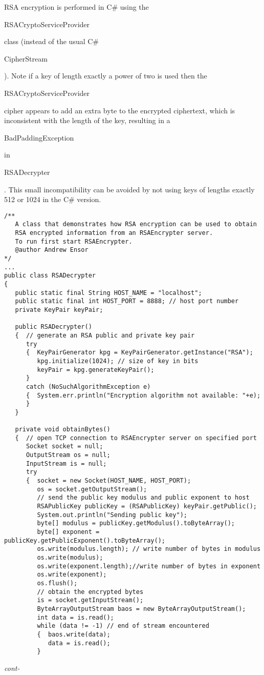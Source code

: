 RSA encryption is performed in C\# using the \begin{code}RSACryptoServiceProvider\end{code}
class (instead of the usual C\# \begin{code}CipherStream\end{code}).
Note if a key of length exactly a power of two is used then the
\begin{code}RSACryptoServiceProvider\end{code} cipher appears to add an
extra byte to the encrypted ciphertext, which is inconsistent
with the length of the key,
resulting in a \begin{code}BadPaddingException\end{code} in \begin{code}RSADecrypter\end{code}.
This small incompatibility can be avoided by not using keys of lengths
exactly 512 or 1024 in the C\# version.
\begin{figure*}\begin{program}\begin{verbatim}
/**
   A class that demonstrates how RSA encryption can be used to obtain
   RSA encrypted information from an RSAEncrypter server.
   To run first start RSAEncrypter.
   @author Andrew Ensor
*/
...
public class RSADecrypter
{
   public static final String HOST_NAME = "localhost";
   public static final int HOST_PORT = 8888; // host port number
   private KeyPair keyPair;

   public RSADecrypter()
   {  // generate an RSA public and private key pair
      try
      {  KeyPairGenerator kpg = KeyPairGenerator.getInstance("RSA");
         kpg.initialize(1024); // size of key in bits
         keyPair = kpg.generateKeyPair();
      }
      catch (NoSuchAlgorithmException e)
      {  System.err.println("Encryption algorithm not available: "+e);
      }
   }

   private void obtainBytes()
   {  // open TCP connection to RSAEncrypter server on specified port
      Socket socket = null;
      OutputStream os = null;
      InputStream is = null;
      try
      {  socket = new Socket(HOST_NAME, HOST_PORT);
         os = socket.getOutputStream();
         // send the public key modulus and public exponent to host
         RSAPublicKey publicKey = (RSAPublicKey) keyPair.getPublic();
         System.out.println("Sending public key");
         byte[] modulus = publicKey.getModulus().toByteArray();
         byte[] exponent = publicKey.getPublicExponent().toByteArray();
         os.write(modulus.length); // write number of bytes in modulus
         os.write(modulus);
         os.write(exponent.length);//write number of bytes in exponent
         os.write(exponent);
         os.flush();
         // obtain the encrypted bytes
         is = socket.getInputStream();
         ByteArrayOutputStream baos = new ByteArrayOutputStream();
         int data = is.read();
         while (data != -1) // end of stream encountered
         {  baos.write(data);
            data = is.read();
         }
\end{verbatim}\hfill \emph{cont-}\end{program}\end{figure*}%
